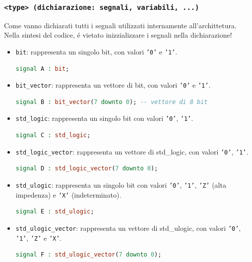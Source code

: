         \subsubsection{\texttt{<type> (dichiarazione: segnali, variabili, ...)}}
        Come vanno dichiarati tutti i segnali utilizzati internamente all'archittetura.\\Nella sintesi del codice, é vietato inizzializzare i segnali nella dichiarazione!
        \begin{itemize}
        \setlength\itemsep{0pt}
            \item \texttt{bit}: rappresenta un singolo bit, con valori \texttt{'0'} e \texttt{'1'}.
            \begin{lstlisting}[language=VHDL]
signal A : bit;
            \end{lstlisting}
            \item \texttt{bit\_vector}: rappresenta un vettore di bit, con valori \texttt{'0'} e \texttt{'1'}.
            \begin{lstlisting}[language=VHDL]
signal B : bit_vector(7 downto 0); -- vettore di 8 bit
            \end{lstlisting}
            \item \texttt{std\_logic}: rappresenta un singolo bit con valori \texttt{'0'}, \texttt{'1'}.
            \begin{lstlisting}[language=VHDL]
signal C : std_logic;
            \end{lstlisting}
            \item \texttt{std\_logic\_vector}: rappresenta un vettore di std\_logic, con valori \texttt{'0'}, \texttt{'1'}.
            \begin{lstlisting}[language=VHDL]
signal D : std_logic_vector(7 downto 0);
            \end{lstlisting}
            \item \texttt{std\_ulogic}: rappresenta un singolo bit con valori \texttt{'0'}, \texttt{'1'}, \texttt{'Z'} (alta impedenza) e \texttt{'X'} (indeterminato).
            \begin{lstlisting}[language=VHDL]
signal E : std_ulogic;
            \end{lstlisting}
            \item \texttt{std\_ulogic\_vector}: rappresenta un vettore di std\_ulogic, con valori \texttt{'0'}, \texttt{'1'}, \texttt{'Z'} e \texttt{'X'}.
            \begin{lstlisting}[language=VHDL]
signal F : std_ulogic_vector(7 downto 0);

\end{lstlisting}
\end{itemize}

